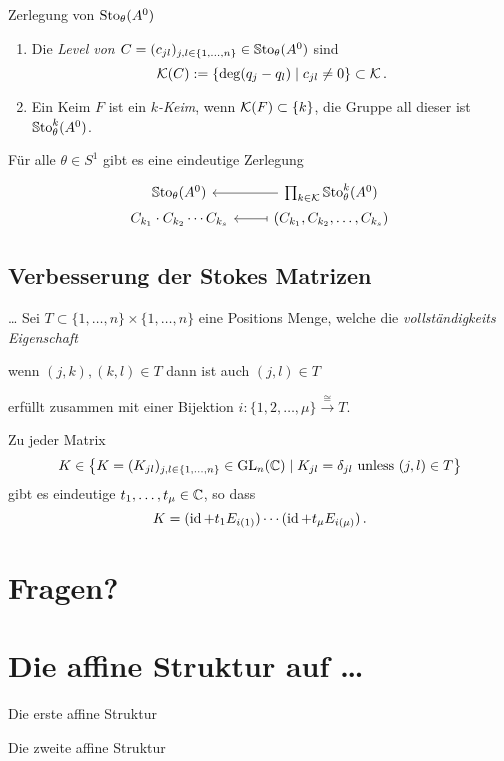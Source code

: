 \begin{frame}[t,fragile]{Zerlegung von $\operatorname{Sto}_\theta(A^0)$}
  \begin{defn}
    \begin{enumerate}[<+->]
    \item Die \emph{Level von
        \boldmath$C=(c_{jl})_{j,l\in\{1,\dots,n\}}\in\operatorname{\mathbb{S}to}_\theta(A^0)$} sind
      \[
        \mathcal{K}(C):= \left\{\deg(q_j-q_l)\mid c_{jl}\neq0\right\} \subset \mathcal{K} \,.
      \]
    \item Ein Keim $F$ ist ein \emph{\boldmath$k$-Keim}, wenn
      $\mathcal{K}(F)\subset\{k\}$, die Gruppe all dieser ist $\operatorname{\mathbb{S}to}_\theta^k(A^0)$.
    \end{enumerate}
  \end{defn}
  \begin{thm}
    Für alle $\theta\in S^1$ gibt es eine eindeutige Zerlegung
    \[ \begin{tikzcd}[row sep=0cm]
        \SSto_\theta(A^0)
        & \prod_{k\in\cK}\SSto_\theta^k(A^0) \lar
        \\ C_{k_1}\cdot C_{k_2}\cdots C_{k_s}
        & \left(C_{k_1}, C_{k_2},\dots, C_{k_s}\right) \lar[maps to]
      \end{tikzcd} \]
  \end{thm}
\end{frame}

\subsection{Verbesserung der Stokes Matrizen}

\begin{frame}[t]{\dots}
  Sei $T\subset\{1,\dots,n\}\times\{1,\dots,n\}$ eine Positions Menge, welche
  die \emph{vollständigkeits Eigenschaft}
    \begin{einr}
      wenn $(j,k),(k,l)\in T$ dann ist auch $(j,l)\in T$
    \end{einr}
    erfüllt zusammen mit einer Bijektion
    $i:\{1,2,\dots,\mu\} \overset{\cong}{\to}T$.
  \begin{lem}
    Zu jeder Matrix
    \[
      K\in \left\{K=(K_{jl})_{j,l\in\{1,\dots,n\}}\in\operatorname{GL}_n(\mathbb{C})\mid
        K_{jl}=\delta_{jl} \text{~unless~} (j,l)\in T \right\}
    \]
    gibt es eindeutige $t_1,\dots,t_\mu\in\mathbb{C}$, so dass
    \[
      K=(\operatorname{id} + t_1E_{i(1)})\cdots(\operatorname{id} + t_{\mu}E_{i(\mu)}) \,.
    \]
  \end{lem}
\end{frame}

\section*{Fragen?}

\section{Die affine Struktur auf \dots}
\begin{frame}[t]{Die erste affine Struktur}

\end{frame}
\begin{frame}[t]{Die zweite affine Struktur}

\end{frame}

